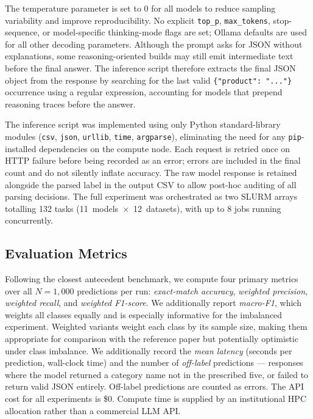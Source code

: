 \documentclass[a4paper,fleqn]{cas-dc}
\begin{document}
The temperature parameter is set to 0 for all models to reduce
sampling variability and improve reproducibility. No explicit
\texttt{top\_p}, \texttt{max\_tokens}, stop-sequence, or model-specific
thinking-mode flags are set; Ollama defaults are used for all other
decoding parameters. Although the prompt asks for JSON without
explanations, some reasoning-oriented builds may still emit
intermediate text before the final answer. The inference script
therefore extracts the final JSON object from the response by searching
for the last valid \texttt{\{"product": "..."\}} occurrence using a
regular expression, accounting for models that prepend reasoning traces
before the answer.

The inference script was implemented using only Python standard-library
modules (\texttt{csv}, \texttt{json}, \texttt{urllib}, \texttt{time},
\texttt{argparse}), eliminating the need for any \texttt{pip}-installed
dependencies on the compute node. Each request is retried once on
HTTP failure before being recorded as an error; errors are included in
the final count and do not silently inflate accuracy. The raw model
response is retained alongside the parsed label in the output CSV to
allow post-hoc auditing of all parsing decisions.
The full experiment was orchestrated as two SLURM arrays totalling
132 tasks (11~models~$\times$~12~datasets), with up to 8 jobs running
concurrently.

\subsection{Evaluation Metrics}

Following the closest antecedent benchmark, we compute four primary
metrics over all $N{=}1{,}000$ predictions per run:
\emph{exact-match accuracy}, \emph{weighted precision},
\emph{weighted recall}, and \emph{weighted F1-score}. We additionally
report \emph{macro-F1}, which weights all classes equally and is
especially informative for the imbalanced experiment. Weighted variants
weight each class by its sample size, making them appropriate for
comparison with the reference paper but potentially optimistic under
class imbalance. We additionally record the \emph{mean latency}
(seconds per prediction, wall-clock time) and the number of
\emph{off-label} predictions --- responses where the model returned a
category name not in the prescribed five, or failed to return valid
JSON entirely. Off-label predictions are counted as errors.
The API cost for all experiments is \$0. Compute time is supplied by
an institutional HPC allocation rather than a commercial LLM API.
\end{document}
